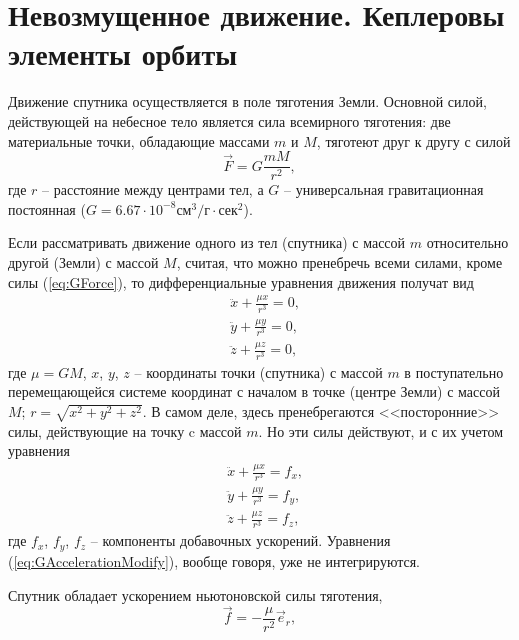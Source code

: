 \section{Невозмущенное движение. Кеплеровы элементы орбиты}
\noindent\indent Движение спутника осуществляется в поле тяготения Земли. Основной силой,
действующей на небесное тело является сила всемирного тяготения: две материальные точки,
обладающие массами $m$ и $M$, тяготеют друг к другу с силой
\begin{equation} \label{eq:GForce}
  \vec{F} = G\frac{mM}{r^2},
\end{equation}
где $r$ -- расстояние между центрами тел, а $G$ -- универсальная гравитационная
постоянная ($G = 6.67\cdot10^{-8}\text{см}^3/г\cdot\text{сек}^2$).\par
Если рассматривать движение одного из тел (спутника) с массой $m$ относительно
другой (Земли) с массой $M$, считая, что можно пренебречь всеми силами, кроме силы
(\ref{eq:GForce}), то дифференциальные уравнения движения получат вид
\begin{equation}
  \begin{aligned}
    &\ddot{x} + \frac{\mu x}{r^3} = 0, \\
    &\ddot{y} + \frac{\mu y}{r^3} = 0, \\
    &\ddot{z} + \frac{\mu z}{r^3} = 0,
  \end{aligned}
\end{equation}
где $\mu = GM$, $x$, $y$, $z$ -- координаты точки (спутника) с массой $m$ в
поступательно перемещающейся системе координат с началом в точке (центре Земли)
с массой $M$; $r = \sqrt{x^2 + y^2 + z^2}$. В самом деле, здесь пренебрегаются
<<посторонние>> силы, действующие на точку c массой $m$. Но эти силы действуют,
и с их учетом уравнения
\begin{equation} \label{eq:GAccelerationModify}
  \begin{aligned}
    &\ddot{x} + \frac{\mu x}{r^3} = f_x, \\
    &\ddot{y} + \frac{\mu y}{r^3} = f_y, \\
    &\ddot{z} + \frac{\mu z}{r^3} = f_z,
  \end{aligned}
\end{equation}
где $f_x$, $f_y$, $f_z$ -- компоненты добавочных ускорений. Уравнения
(\ref{eq:GAccelerationModify}), вообще говоря, уже не интегрируются.\par
Спутник обладает ускорением ньютоновской силы тяготения,
\begin{equation}  \label{eq:GAcceleration}
  \vec{f} = - \frac{\mu}{r^2}\vec{e}_r,
\end{equation}

